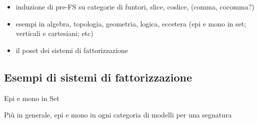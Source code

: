 \begin{itemize}
	\item induzione di pre-FS su categorie di funtori, slice, coslice, (comma, cocomma?)
	\item esempi in algebra, topologia, geometria, logica, eccetera (epi e mono in set; verticali e cartesiani; etc)
	\item il poset dei sistemi di fattorizzazione
\end{itemize}
\subsection{Esempi di sistemi di fattorizzazione}
\begin{example}
	Epi e mono in Set
\end{example}
Più in generale, epi e mono in ogni categoria di modelli per una segnatura
\begin{example}

\end{example}

\begin{example}

\end{example}

\begin{example}

\end{example}

\begin{example}

\end{example}

